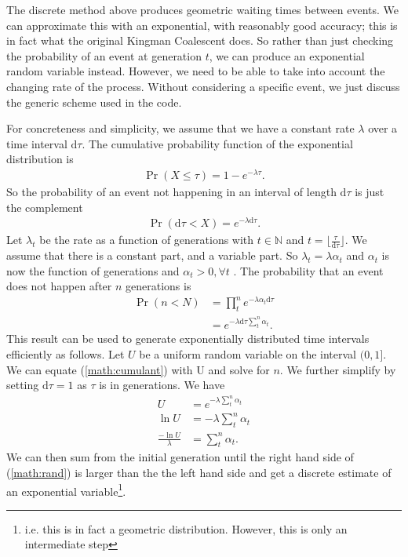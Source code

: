 \documentclass{article}
\begin{document}
The discrete method above produces geometric waiting times between events. We can
approximate this with an exponential, with reasonably good accuracy; this is in
fact what the original Kingman Coalescent does. So rather than just checking the
probability of an event at generation $t$, we can produce an exponential random
variable instead. However, we need to be able to take into account the changing
rate of the process. Without considering a specific event, we just discuss the
generic scheme used in the code. 

\renewcommand{\d}{\textrm{d}}

For concreteness and simplicity, we assume that we have a constant rate $\lambda$
over a time interval $\d \tau$. The cumulative probability function of the
exponential distribution is
\begin{align}
	\Pr (X \leq \tau)=1-e^{-\lambda \tau}.
\end{align}
So the probability of an event not happening in an interval of length $\d \tau$
is just the complement
\begin{align}
	\Pr (\d \tau < X) = e^{-\lambda \d \tau}.
\end{align}
Let $\lambda_t$ be the rate as a function of generations with $t \in
\mathbb{N}$ and $t= \lfloor \frac{\tau}{\d \tau} \rfloor$. We assume that there
is a constant part, and a variable part. So $\lambda_t = \lambda \alpha_t$ and
$\alpha_t$ is now the function of generations and $\alpha_t>0, \forall t$ . The
probability that an event does not happen after $n$ generations is 
\begin{align}
	\Pr (n<N) &= \prod_t^n e^{-\lambda \alpha_t \d \tau} \\
	&= e^{-\lambda \d \tau \sum_t^n \alpha_t}.
	\label{math:cumulant}
\end{align}
This result can be used to generate exponentially distributed time
intervals efficiently as follows. Let $U$ be a uniform random variable on the
interval $(0,1]$. We can equate
(\ref{math:cumulant}) with U and solve for $n$. We further simplify by setting
$\d \tau=1$ as $\tau$ is in generations. We have
\begin{align}
	U&=e^{-\lambda \sum_t^n \alpha_t} \\
	\ln U&=-\lambda \sum_t^n \alpha_t \\
	\frac{-\ln U}{\lambda}&=\sum_t^n \alpha_t .
	\label{math:rand}
\end{align}
We can then sum from the initial generation until the right hand side of
(\ref{math:rand}) is larger than the the left hand side and get a discrete
estimate of an exponential variable\footnote{i.e. this is in fact a geometric
distribution. However, this is only an intermediate step}. 
\end{document}
